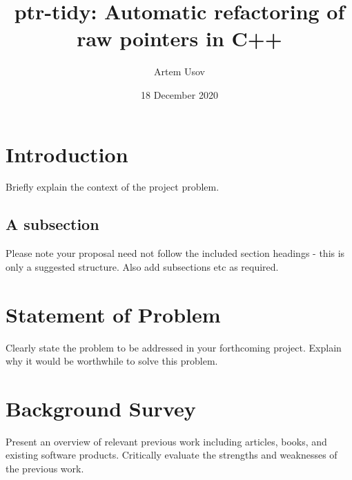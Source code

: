 \documentclass{proposal}
\begin{document}


    \title{ptr-tidy: Automatic refactoring of raw pointers in C++}
    \author{Artem Usov}
    \date{18 December 2020}
    \maketitle
    \tableofcontents
    \newpage




    \section{Introduction}\label{sec:intro}

    Briefly explain the context of the project problem.

    \subsection{A subsection}\label{subsec:a-subsection}
    Please note your proposal need not follow the included section headings - this is only a suggested structure.
    Also add subsections etc as required.




    \section{Statement of Problem}\label{sec:statement-of-problem}

    Clearly state the problem to be addressed in your forthcoming project.
    Explain why it would be worthwhile to solve this problem.




    \section{Background Survey}\label{sec:background-survey}

    Present an overview of relevant previous work including articles, books, and existing software products.
    Critically evaluate the strengths and weaknesses of the previous work.


\end{document}
